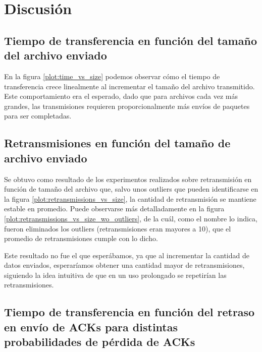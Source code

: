 \documentclass[a4paper, 10pt, twoside]{article}
\begin{document}


\section{Discusión}
\label{sec:discusion}


\subsection{Tiempo de transferencia en función del tamaño del archivo enviado}

En la figura \ref{plot:time_vs_size} podemos observar cómo el tiempo de transferencia crece linealmente al incrementar el tamaño del archivo transmitido. Este comportamiento era el esperado, dado que para archivos cada vez más grandes, las transmisiones requieren proporcionalmente más envíos de paquetes para ser completadas.


\subsection{Retransmisiones en función del tamaño de archivo enviado}

Se obtuvo como resultado de los experimentos realizados sobre retransmisión en función de tamaño del archivo que, salvo unos outliers que pueden identificarse en la figura \ref{plot:retransmissions_vs_size}, la cantidad de retransmisión se mantiene estable en promedio. Puede observarse más detalladamente en la figura \ref{plot:retransmissions_vs_size_wo_outliers}, de la cuál, como el nombre lo indica, fueron eliminados los outliers (retransmisiones eran mayores a 10), que el promedio de retransmisiones cumple con lo dicho.

Este resultado no fue el que esperábamos, ya que al incrementar la cantidad de datos enviados, esperaríamos obtener una cantidad mayor de retransmisiones, siguiendo la idea intuitiva de que en un uso prolongado se repetirían las retransmisiones.

\subsection{Tiempo de transferencia en función del retraso en envío de ACKs para distintas probabilidades de pérdida de ACKs}
\end{document}

